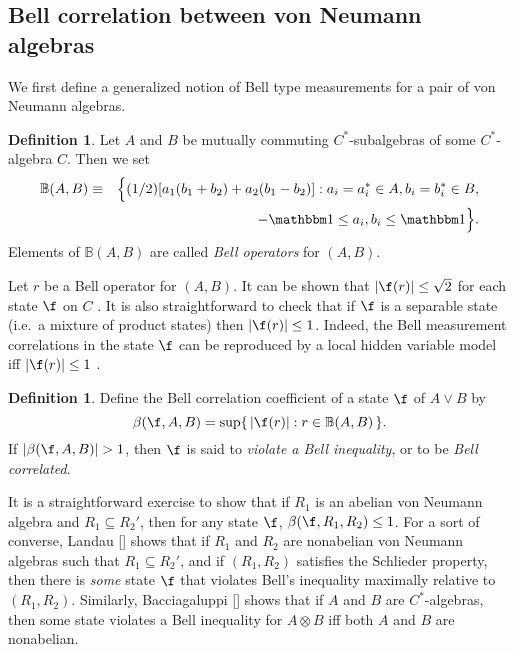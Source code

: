 \documentclass[12pt]{article}
\newcommand{\abs}[1]{|#1|}
\theoremstyle{definition}
\theoremstyle{definition}
\newtheorem{defn}[thm]{Definition}
\theoremstyle{remark}
\def\7#1{{\mathbb #1}}
\def\8#1{{\mathbbm #1}}
\begin{document}
\subsection{Bell correlation between von Neumann algebras}
\label{bell}

We first define a generalized notion of Bell type measurements for a
pair of von Neumann algebras.

\begin{defn} Let $A$ and $B$ be mutually commuting $C^*$-subalgebras
  of some $C^*$-algebra $C$.  Then we set \begin{eqnarray*} \7B (A,B)
    &\equiv & \Bigl\{ (1/2) [a_1(b_1+b_2)+a_2(b_1-b_2)] : a_i=a_i^*\in
    A, b_i=b_i^{*}\in B , \\
&& \ \ -\81 \leq a_{i},b_{i} \leq \81 \Bigr\}
    .\end{eqnarray*} Elements of $\7B (A,B)$ are called \emph{Bell
    operators} for $(A,B)$.
\end{defn}

Let $r$ be a Bell operator for $(A,B)$. It can be shown that $\abs{\f
  (r)}\leq \sqrt{2}$ for each state $\f$ on $C$ \cite{early-sum}.  It
is also straightforward to check that if $\f$ is a separable state
(i.e.\ a mixture of product states) then $\abs{\f (r)}\leq 1$.
Indeed, the Bell measurement correlations in the state $\f$ can be
reproduced by a local hidden variable model iff $\abs{\f (r)}\leq 1$
\cite{early-sum,baebel}.

\begin{defn} Define the Bell correlation coefficient of a state $\f$
  of $A\vee B$ by 
$$ \beta (\f ,A,B) = \sup \{ \, \abs{\f (r) }:r\in \7B (A,B) \,\} . $$
If $\abs{\beta (\f ,A,B)}>1$, then $\f$ is said to \emph{violate a
  Bell inequality}, or to be \emph{Bell correlated}.
\end{defn}

It is a straightforward exercise to show that if $R_1$ is an abelian
von Neumann algebra and $R_1\subseteq R_2'$, then for any state $\f$,
$\beta (\f ,R_1,R_2)\leq 1$.  For a sort of converse, Landau
[\citeyear{lan}] shows that if $R_1$ and $R_2$ are nonabelian von
Neumann algebras such that $R_1\subseteq R_2'$, and if $(R_1,R_2)$
satisfies the Schlieder property, then there is \emph{some} state $\f$
that violates Bell's inequality maximally relative to $(R_1,R_2)$.
Similarly, Bacciagaluppi [\citeyear{bacc}] shows that if $A$ and $B$
are $C^*$-algebras, then some state violates a Bell inequality for
$A\otimes B$ iff both $A$ and $B$ are nonabelian.
\end{document}

